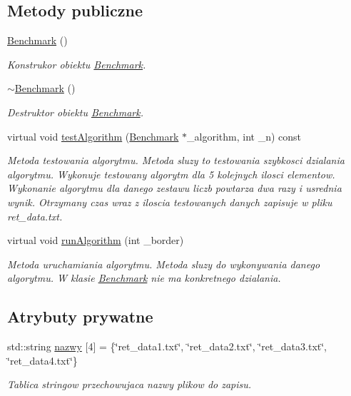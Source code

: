 \subsection*{Metody publiczne}
\begin{DoxyCompactItemize}
\item 
\hyperlink{class_benchmark_acfca497989836a688d44477802e822d8}{Benchmark} ()
\begin{DoxyCompactList}\small\item\em Konstrukor obiektu \hyperlink{class_benchmark}{Benchmark}. \end{DoxyCompactList}\item 
\hyperlink{class_benchmark_a20476e07f09e2b20ed3e9a7f13a570e6}{$\sim$\-Benchmark} ()
\begin{DoxyCompactList}\small\item\em Destruktor obiektu \hyperlink{class_benchmark}{Benchmark}. \end{DoxyCompactList}\item 
virtual void \hyperlink{class_benchmark_a900bc0d26c2ed6aa45afe4d5b295ccd1}{test\-Algorithm} (\hyperlink{class_benchmark}{Benchmark} $\ast$\-\_\-algorithm, int \-\_\-n) const 
\begin{DoxyCompactList}\small\item\em Metoda testowania algorytmu. Metoda sluzy to testowania szybkosci dzialania algorytmu. Wykonuje testowany algorytm dla 5 kolejnych ilosci elementow. Wykonanie algorytmu dla danego zestawu liczb powtarza dwa razy i usrednia wynik. Otrzymany czas wraz z iloscia testowanych danych zapisuje w pliku ret\-\_\-data.\-txt. \end{DoxyCompactList}\item 
virtual void \hyperlink{class_benchmark_a6363894c058e8bfe146de09d7126b29c}{run\-Algorithm} (int \-\_\-border)
\begin{DoxyCompactList}\small\item\em Metoda uruchamiania algorytmu. Metoda sluzy do wykonywania danego algorytmu. W klasie \hyperlink{class_benchmark}{Benchmark} nie ma konkretnego dzialania. \end{DoxyCompactList}\end{DoxyCompactItemize}
\subsection*{Atrybuty prywatne}
\begin{DoxyCompactItemize}
\item 
std\-::string \hyperlink{class_benchmark_aee0beda65009e7334d34c5957f78c49a}{nazwy} \mbox{[}4\mbox{]} = \{\char`\"{}ret\-\_\-data1.\-txt\char`\"{}, \char`\"{}ret\-\_\-data2.\-txt\char`\"{}, \char`\"{}ret\-\_\-data3.\-txt\char`\"{}, \char`\"{}ret\-\_\-data4.\-txt\char`\"{}\}
\begin{DoxyCompactList}\small\item\em Tablica stringow przechowujaca nazwy plikow do zapisu. \end{DoxyCompactList}\end{DoxyCompactItemize}


